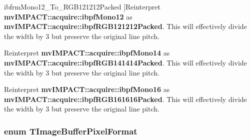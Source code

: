 \begin{Desc}
\begin{description}
{\hypertarget{group___common_interface_gga077e155accbe145213c1c34895f961f2ae0a32cb34a1dfbe91f884eb591343e6e}{ibfrm\+Mono12\+\_\+\+To\+\_\+\+R\+G\+B121212\+Packed}\label{group___common_interface_gga077e155accbe145213c1c34895f961f2ae0a32cb34a1dfbe91f884eb591343e6e}
}]Reinterpret {\bfseries mv\+I\+M\+P\+A\+C\+T\+::acquire\+::ibpf\+Mono12} as {\bfseries mv\+I\+M\+P\+A\+C\+T\+::acquire\+::ibpf\+R\+G\+B121212\+Packed}. This will effectively divide the width by 3 but preserve the original line pitch. \item[{\em 
\hypertarget{group___common_interface_gga077e155accbe145213c1c34895f961f2a4c6a610c1eb969792a624ef39da1196a}{ibfrm\+Mono14\+\_\+\+To\+\_\+\+R\+G\+B141414\+Packed}\label{group___common_interface_gga077e155accbe145213c1c34895f961f2a4c6a610c1eb969792a624ef39da1196a}
}]Reinterpret {\bfseries mv\+I\+M\+P\+A\+C\+T\+::acquire\+::ibpf\+Mono14} as {\bfseries mv\+I\+M\+P\+A\+C\+T\+::acquire\+::ibpf\+R\+G\+B141414\+Packed}. This will effectively divide the width by 3 but preserve the original line pitch. \item[{\em 
\hypertarget{group___common_interface_gga077e155accbe145213c1c34895f961f2a9ab30ea5d9e43103d20e683cc36bd375}{ibfrm\+Mono16\+\_\+\+To\+\_\+\+R\+G\+B161616\+Packed}\label{group___common_interface_gga077e155accbe145213c1c34895f961f2a9ab30ea5d9e43103d20e683cc36bd375}
}]Reinterpret {\bfseries mv\+I\+M\+P\+A\+C\+T\+::acquire\+::ibpf\+Mono16} as {\bfseries mv\+I\+M\+P\+A\+C\+T\+::acquire\+::ibpf\+R\+G\+B161616\+Packed}. This will effectively divide the width by 3 but preserve the original line pitch. \end{description}
\end{Desc}
\hypertarget{group___common_interface_ga456e8aa76e06bb761f27c52141475985}{
\subsubsection[{T\+Image\+Buffer\+Pixel\+Format}]{\setlength{\rightskip}{0pt plus 5cm}enum {\bf T\+Image\+Buffer\+Pixel\+Format}}}\label{group___common_interface_ga456e8aa76e06bb761f27c52141475985}


